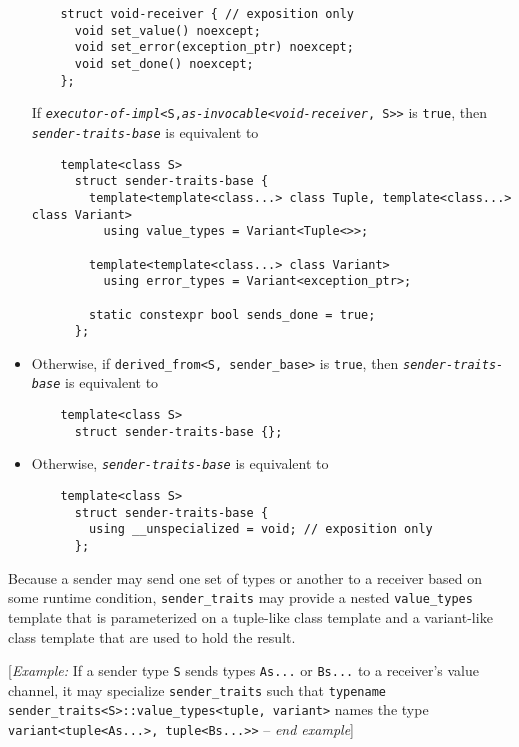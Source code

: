 \documentclass[a4paper,12pt,notitlepage,twoside,openright]{article}
\begin{document}
\begin{itemize}
  \begin{verbatim}
    struct void-receiver { // exposition only
      void set_value() noexcept;
      void set_error(exception_ptr) noexcept;
      void set_done() noexcept;
    };
  \end{verbatim}

  If
  \emph{\texttt{executor-of-impl}}\texttt{<S,}\emph{\texttt{as-invocable}}\texttt{<}\emph{\texttt{void-receiver}}\texttt{, S>>}
  is \texttt{true}, then
  \emph{\texttt{sender-traits-base}} is equivalent to

  \begin{verbatim}
    template<class S>
      struct sender-traits-base {
        template<template<class...> class Tuple, template<class...> class Variant>
          using value_types = Variant<Tuple<>>;

        template<template<class...> class Variant>
          using error_types = Variant<exception_ptr>;

        static constexpr bool sends_done = true;
      };
  \end{verbatim}
\item
  Otherwise, if \texttt{derived_from<S, sender_base>} is
  \texttt{true}, then
  \emph{\texttt{sender-traits-base}} is equivalent to

  \begin{verbatim}
    template<class S>
      struct sender-traits-base {};
  \end{verbatim}
\item
  Otherwise, \emph{\texttt{sender-traits-base}} is
  equivalent to

  \begin{verbatim}
    template<class S>
      struct sender-traits-base {
        using __unspecialized = void; // exposition only
      };
  \end{verbatim}
\end{itemize}

Because a sender may send one set of types or another to a receiver
based on some runtime condition, \texttt{sender_traits} may
provide a nested \texttt{value_types} template that is
parameterized on a tuple-like class template and a variant-like class
template that are used to hold the result.

{[}\emph{Example:} If a sender type \texttt{S} sends types
\texttt{As...} or \texttt{Bs...} to a receiver's
value channel, it may specialize \texttt{sender_traits} such
that
\texttt{typename sender_traits<S>::value_types<tuple, variant>}
names the type \texttt{variant<tuple<As...>, tuple<Bs...>>}
-- \emph{end example}{]}
\end{document}
